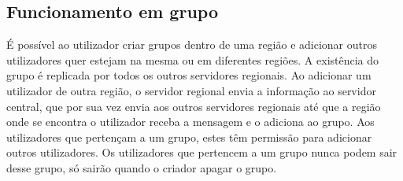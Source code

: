 \subsection{Funcionamento em grupo}
É possível ao utilizador criar grupos dentro de uma região e adicionar outros utilizadores quer estejam na mesma ou em diferentes regiões. A existência do grupo é replicada por todos os outros servidores regionais. Ao adicionar um utilizador de outra região, o servidor regional envia a informação ao servidor central, que por sua vez envia aos outros servidores regionais até que a região onde se encontra o utilizador receba a mensagem e o adiciona ao grupo. Aos utilizadores que pertençam a um grupo, estes têm permissão para adicionar outros utilizadores. Os utilizadores que pertencem a um grupo nunca podem sair desse grupo, só sairão quando o criador apagar o grupo.